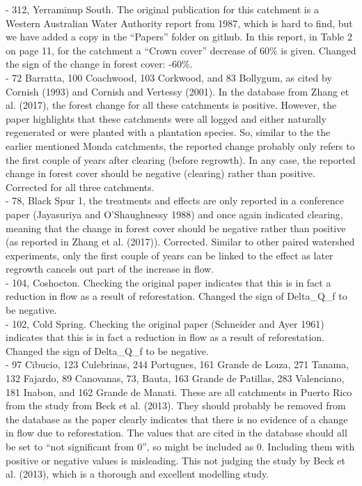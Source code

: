 \documentclass[]{elsarticle} %
\begin{document}
- 312, Yerraminup South. The original publication for this catchment is a Western Australian Water Authority report from 1987, which is hard to find, but we have added a copy in the ``Papers'' folder on github. In this report, in Table 2 on page 11, for the catchment a ``Crown cover'' decrease of 60\% is given. Changed the sign of the change in forest cover: -60\%.\\
- 72 Barratta, 100 Coachwood, 103 Corkwood, and 83 Bollygum, as cited by Cornish (1993) and Cornish and Vertessy (2001). In the database from Zhang et al. (2017), the forest change for all these catchments is positive. However, the paper highlights that these catchments were all logged and either naturally regenerated or were planted with a plantation species. So, similar to the the earlier mentioned Monda catchments, the reported change probably only refers to the first couple of years after clearing (before regrowth). In any case, the reported change in forest cover should be negative (clearing) rather than positive. Corrected for all three catchments.\\
- 78, Black Spur 1, the treatments and effects are only reported in a conference paper (Jayasuriya and O'Shaughnessy 1988) and once again indicated clearing, meaning that the change in forest cover should be negative rather than positive (as reported in Zhang et al. (2017)). Corrected. Similar to other paired watershed experiments, only the first couple of years can be linked to the effect as later regrowth cancels out part of the increase in flow.\\
- 104, Coshocton. Checking the original paper indicates that this is in fact a reduction in flow as a result of reforestation. Changed the sign of Delta\_Q\_f to be negative.\\
- 102, Cold Spring. Checking the original paper (Schneider and Ayer 1961) indicates that this is in fact a reduction in flow as a result of reforestation. Changed the sign of Delta\_Q\_f to be negative.\\
- 97 Cibucio, 123 Culebrinas, 244 Portugues, 161 Grande de Loıza, 271 Tanama, 132 Fajardo, 89 Canovanas, 73, Bauta, 163 Grande de Patillas, 283 Valenciano, 181 Inabon, and 162 Grande de Manati. These are all catchments in Puerto Rico from the study from Beck et al. (2013). They should probably be removed from the database as the paper clearly indicates that there is no evidence of a change in flow due to reforestation. The values that are cited in the database should all be set to ``not significant from 0'', so might be included as 0. Including them with positive or negative values is misleading. This not judging the study by Beck et al. (2013), which is a thorough and excellent modelling study.\\
\end{document}
